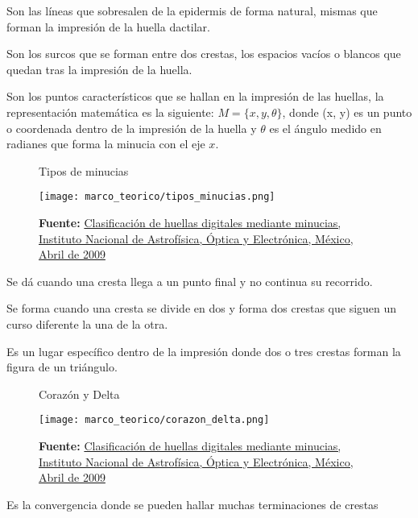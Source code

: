\documentclass[../principal]{subfiles}
\begin{document}
  \begin{description}[align=left]
    \item[Cresta:] Son las líneas que sobresalen de la epidermis de forma natural, mismas que forman la impresión de la huella dactilar.
    \item[Valle:] Son los surcos que se forman entre dos crestas, los espacios vacíos o blancos que quedan tras la impresión de la huella.
    \item[Minucia:] Son los puntos característicos que se hallan en la impresión de las huellas, la representación matemática es la siguiente: $ M = \{x, y, \theta\} $, donde (x, y) es un punto o coordenada dentro de la impresión de la huella y $ \theta $ es el ángulo medido en radianes que forma la minucia con el eje $ x $.

    \begin{figure}[H]
      \centering
      \caption{Tipos de minucias}
      \texttt{[image: marco\_teorico/tipos\_minucias.png]}
      \caption*{\textbf{Fuente:} \href{http://ccc.inaoep.mx/~esucar/Clases-mgp/Proyectos/reporte_modelos_huellas.pdf}{Clasificación de huellas digitales mediante minucias, Instituto Nacional de Astrofísica, Óptica y Electrónica, México, Abril de 2009} \cite{reporte:clasificacion_huellas_mediante_minucias}}
    \end{figure}

    \item[Terminación:] Se dá cuando una cresta llega a un punto final y no continua su recorrido.
    \item[Bifurcación:] Se forma cuando una cresta se divide en dos y forma dos crestas que siguen un curso diferente la una de la otra.
    \item[Delta:] Es un lugar específico dentro de la impresión donde dos o tres crestas forman la figura de un triángulo.

    \begin{figure}[H]
      \centering
      \caption{Corazón y Delta}
      \texttt{[image: marco\_teorico/corazon\_delta.png]}
      \caption*{\textbf{Fuente:} \href{http://ccc.inaoep.mx/~esucar/Clases-mgp/Proyectos/reporte_modelos_huellas.pdf}{Clasificación de huellas digitales mediante minucias, Instituto Nacional de Astrofísica, Óptica y Electrónica, México, Abril de 2009} \cite{reporte:clasificacion_huellas_mediante_minucias}}
    \end{figure}

    \item[Corazón:] Es la convergencia donde se pueden hallar muchas terminaciones de crestas
  \end{description}
\end{document}
